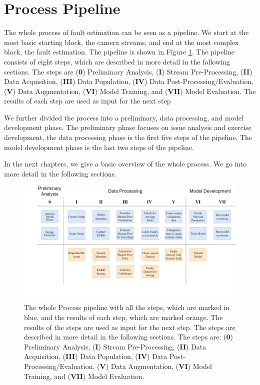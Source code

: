 \section{Process Pipeline}
\label{sec:process_pipeline}

The whole process of fault estimation can be seen as a pipeline. We start at the most basic starting block, the camera streams, and end at the most complex block, the fault estimation. The pipeline is shown in Figure \ref{fig:process_pipeline}. The pipeline consists of eight steps, which are described in more detail in the following sections. The steps are (\textbf{0}) Preliminary Analysis, (\textbf{I}) Stream Pre-Processing, (\textbf{II}) Data Acquisition, (\textbf{III}) Data Population, (\textbf{IV}) Data Post-Processing/Evaluation, (\textbf{V}) Data Augmentation, (\textbf{VI}) Model Training, and (\textbf{VII}) Model Evaluation. The results of each step are used as input for the next step

We further divided the process into a preliminary, data processing, and model development phase. The preliminary phase focuses on issue analysis and exercise development, the data processing phase is the first five steps of the pipeline. The model development phase is the last two steps of the pipeline.

In the next chapters, we give a basic overview of the whole process. We go into more detail in the following sections.

\begin{figure}[ht]
    \centering
    \includegraphics[width=\textwidth]{figures/ProcessingPipeline/ProcessingPipeline.png}
    \caption[Process Pipeline with all steps]{The whole Process pipeline with all the steps, which are marked in blue, and the results of each step, which are marked orange. The results of the steps are used as input for the next step. The steps are described in more detail in the following sections. The steps are: (\textbf{0}) Preliminary Analysis, (\textbf{I}) Stream Pre-Processing, (\textbf{II}) Data Acquisition, (\textbf{III}) Data Population, (\textbf{IV}) Data Post-Processing/Evaluation, (\textbf{V}) Data Augmentation, (\textbf{VI}) Model Training, and (\textbf{VII}) Model Evaluation.}
    \label{fig:process_pipeline}
\end{figure}
